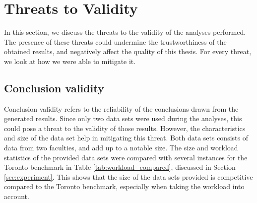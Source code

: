 
\section{Threats to Validity}\label{sec:threats}

In this section, we discuss the threats to the validity of the analyses performed. The presence of these threats could undermine the trustworthiness of the obtained results, and negatively affect the quality of this thesis. For every threat, we look at how we were able to mitigate it.




\subsection{Conclusion validity}

Conclusion validity refers to the reliability of the conclusions drawn from the generated results. Since only two data sets were used during the analyses, this could pose a threat to the validity of those results. However, the characteristics and size of the data set help in mitigating this threat. Both data sets consists of data from two faculties, and add up to a notable size. The size and workload statistics of the provided data sets were compared with several instances for the Toronto benchmark in Table \ref{tab:workload_compared}, discussed in Section \ref{sec:experiment}. This shows that the size of the data sets provided is competitive compared to the Toronto benchmark, especially when taking the workload into account.




